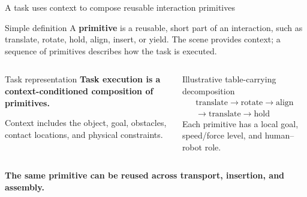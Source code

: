 \documentclass[aspectratio=169,11pt]{beamer}
\begin{document}
\begin{frame}{A task uses context to compose reusable interaction primitives}
\begin{alertblock}{Simple definition}
A \textbf{primitive} is a reusable, short part of an interaction, such as translate, rotate, hold, align, insert, or yield. The scene provides context; a sequence of primitives describes how the task is executed.
\end{alertblock}
\begin{columns}[T,onlytextwidth]
\begin{block}{Task representation}
\centering\textbf{Task execution is a context-conditioned composition of primitives.}\par
\vspace{0.14cm}
\raggedright
Context includes the object, goal, obstacles, contact locations, and physical constraints.
\end{block}
\begin{block}{Illustrative table-carrying decomposition}
\[
\begin{gathered}
\text{translate}\rightarrow\text{rotate}\rightarrow\text{align}\\
\rightarrow\text{translate}\rightarrow\text{hold}
\end{gathered}
\]
Each primitive has a local goal, speed/force level, and human--robot role.
\end{block}
\end{columns}
\vspace{0.1cm}
\centering\textbf{The same primitive can be reused across transport, insertion, and assembly.}
\end{frame}
\end{document}
